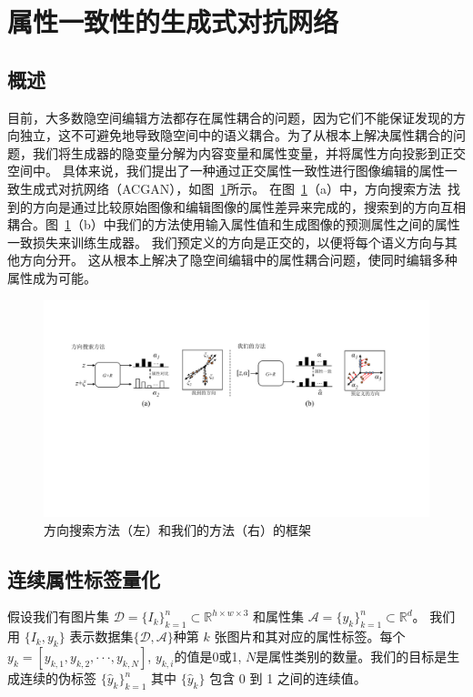 \section{属性一致性的生成式对抗网络}

\subsection{概述}
目前，大多数隐空间编辑方法都存在属性耦合的问题，因为它们不能保证发现的方向独立，这不可避免地导致隐空间中的语义耦合。为了从根本上解决属性耦合的问题，我们将生成器的隐变量分解为内容变量和属性变量，并将属性方向投影到正交空间中。
具体来说，我们提出了一种通过正交属性一致性进行图像编辑的属性一致生成式对抗网络（ACGAN），如图~\ref{fig:framework}所示。 在图~\ref{fig:framework}（a）中，方向搜索方法~\cite{icml2020, iclr2021}找到的方向是通过比较原始图像和编辑图像的属性差异来完成的，搜索到的方向互相耦合。图~\ref{fig:framework}（b）中我们的方法使用输入属性值和生成图像的预测属性之间的属性一致损失来训练生成器。 我们预定义的方向是正交的，以便将每个语义方向与其他方向分开。
这从根本上解决了隐空间编辑中的属性耦合问题，使同时编辑多种属性成为可能。

\begin{figure}
    \centering
    \includegraphics[width=1\linewidth]{figures/ACGAN/framework.pdf}
    \caption{方向搜索方法（左）和我们的方法（右）的框架}
    \label{fig:framework}
  \end{figure}

\subsection{连续属性标签量化}
假设我们有图片集 $\mathcal{D} = \{I_k\}_{k=1}^n \subset \mathbb{R}^{h \times w \times 3}$ 和属性集 $\mathcal{A} = \{y_k\}_{k=1}^n \subset \mathbb{R}^{d}$。 我们用 $\{I_k, y_k\}$ 表示数据集$\{\mathcal{D}, \mathcal{A}\}$种第 $k$ 张图片和其对应的属性标签。每个$y_k=[y_{k,1}, y_{k,2}, \cdot \cdot \cdot ,y_{k,N}]$, $y_{k,i}$的值是0或1, $N$是属性类别的数量。我们的目标是生成连续的伪标签 $\{\hat{y}_k\}_{k=1}^n$ 其中 $\{\hat{y}_k\}$ 包含 0 到 1 之间的连续值。

